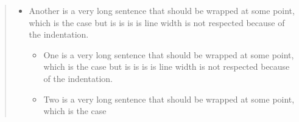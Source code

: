 \begin{abstract}
\begin{another}
\begin{itemize}
                  point, which is the
                  case but is is is is
                  line width is not
                  respected because of
                  the indentation.
                  Two is a very long
                  sentence that should
                  be wrapped at some
                  point, which is the
                  case but is is is is
                  line width is not
                  respected because of
                  the indentation.
            \item
                  Another is a very
                  long sentence that
                  should be wrapped at
                  some point, which is
                  the case but is is is
                  is line width is not
                  respected because of
                  the indentation.
                  \begin{itemize}
                      \item
                            One is a
                            very long
                            sentence
                            that should
                            be wrapped
                            at some
                            point,
                            which is
                            the case
                            but is is
                            is is line
                            width is
                            not
                            respected
                            because of
                            the
                            indentation.
                      \item
                            Two is a
                            very long
                            sentence
                            that should
                            be wrapped
                            at some
                            point,
                            which is
                            the case

\end{itemize}
\end{itemize}
\end{another}
\end{abstract}
